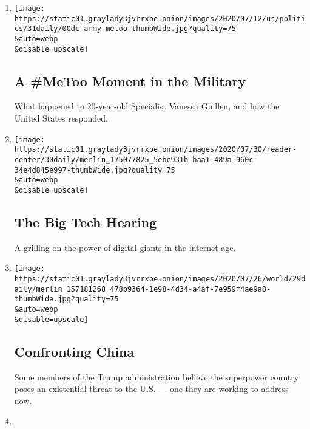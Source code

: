 \begin{enumerate}
\def\labelenumi{\arabic{enumi}.}
\item
  \href{/2020/07/31/podcasts/the-daily/vanessa-guillen-military-metoo.html}{}

  \texttt{[image: https://static01.graylady3jvrrxbe.onion/images/2020/07/12/us/politics/31daily/00dc-army-metoo-thumbWide.jpg?quality=75\\\&auto=webp\\\&disable=upscale]}

  \hypertarget{a-metoo-moment-in-the-military}{%
  \subsection{A \#MeToo Moment in the
  Military}\label{a-metoo-moment-in-the-military}}

  What happened to 20-year-old Specialist Vanessa Guillen, and how the
  United States responded.
\item
  \href{/2020/07/30/podcasts/the-daily/congress-facebook-amazon-google-apple.html}{}

  \texttt{[image: https://static01.graylady3jvrrxbe.onion/images/2020/07/30/reader-center/30daily/merlin\_175077825\_5ebc931b-baa1-489a-960c-34e4d845e997-thumbWide.jpg?quality=75\\\&auto=webp\\\&disable=upscale]}

  \hypertarget{the-big-tech-hearing}{%
  \subsection{The Big Tech Hearing}\label{the-big-tech-hearing}}

  A grilling on the power of digital giants in the internet age.
\item
  \href{/2020/07/29/podcasts/the-daily/china-trump-foreign-policy.html}{}

  \texttt{[image: https://static01.graylady3jvrrxbe.onion/images/2020/07/26/world/29daily/merlin\_157181268\_478b9364-1e98-4d34-a4af-7e959f4ae9a8-thumbWide.jpg?quality=75\\\&auto=webp\\\&disable=upscale]}

  \hypertarget{confronting-china}{%
  \subsection{Confronting China}\label{confronting-china}}

  Some members of the Trump administration believe the superpower
  country poses an existential threat to the U.S. --- one they are
  working to address now.
\item
  \href{/2020/07/28/podcasts/the-daily/unemployment-benefits-coronavirus.html}{}


\end{enumerate}
